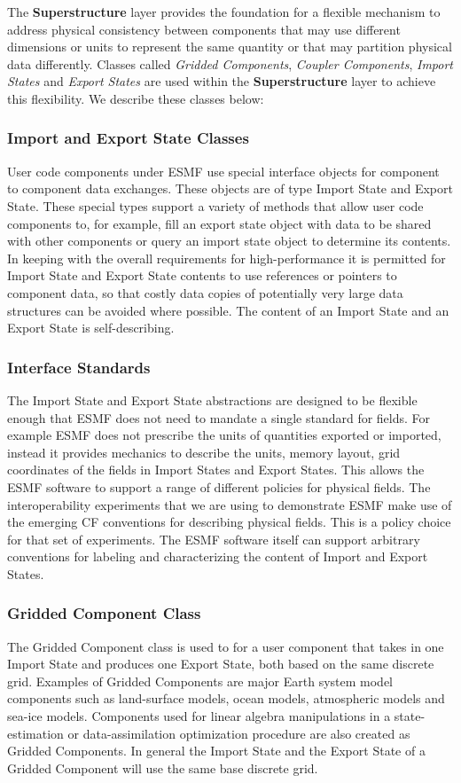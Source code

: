 The {\bf Superstructure} layer provides
the foundation for a flexible mechanism to address physical consistency between components that may use different dimensions or units to represent the
same quantity or that may partition physical data differently. Classes called {\it Gridded Components}, 
{\it Coupler Components}, {\it Import States} and {\it Export States} are used within the {\bf Superstructure} layer
to achieve this flexibility.
We describe these classes below:

\subsubsection{Import and Export State Classes}
User code components under ESMF use special interface objects for component to component data exchanges. These objects are 
of type Import State and Export State. These special types support a variety of methods that allow user code components 
to, for example, fill an export state object with data to be shared with other components or query an import state object to 
determine its contents. In keeping with the overall requirements for high-performance it is permitted for Import State and
Export State contents to use references or pointers to component data, so that costly data copies of potentially
very large data structures can be avoided where possible. The content of an Import State and an Export State is 
self-describing.

\subsubsection{Interface Standards}
The Import State and Export State abstractions are designed to be flexible enough
that ESMF does not need to mandate a single standard for fields. For example ESMF does not prescribe the units
of quantities exported or imported, instead it provides mechanics to describe the units, memory layout, grid coordinates 
of the fields in Import States and Export States.  This allows the ESMF software to support a range of different policies for
physical fields. The interoperability experiments that we are using to demonstrate ESMF make use of the emerging
CF conventions \cite{ref:CF} for describing physical fields. This is a policy choice for that set of experiments. The ESMF 
software itself can support arbitrary conventions for labeling and characterizing the content of Import and 
Export States.

\subsubsection{Gridded Component Class}
The Gridded Component class is used to for a user component that takes in one Import State and produces one
Export State, both based on the same discrete grid. Examples of Gridded Components are major Earth system 
model components such as land-surface models, ocean models, atmospheric models and sea-ice models. Components 
used for linear algebra manipulations in a state-estimation or data-assimilation optimization procedure are also 
created as Gridded Components. In general the Import State and the Export State of a Gridded Component will 
use the same base discrete grid.

